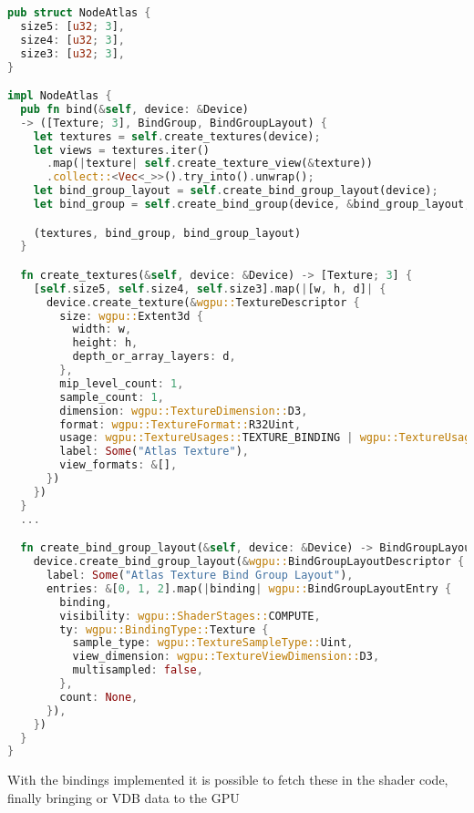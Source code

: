 \begin{enumerate}
\begin{lstlisting}[language=rust, captionpos=b, caption={
    \texttt{NodeAtlas} definition: The three fields in are the sizes of each atlas.
    The \texttt{create\_textures} creates 3 textures, sets the correct dimensions and sets value type to \texttt{R32Uint} represent a 4 byte single channel which can be used depending on what the value represents.
    The \texttt{create\_bind\_group\_layout} preparse the binding for compute shaders, setting the sample type to \texttt{Uint} to give eas of acess to the atlases; data.
},label={atlas2idx}]
pub struct NodeAtlas {
  size5: [u32; 3],
  size4: [u32; 3],
  size3: [u32; 3],
}

impl NodeAtlas {
  pub fn bind(&self, device: &Device)
  -> ([Texture; 3], BindGroup, BindGroupLayout) {
    let textures = self.create_textures(device);
    let views = textures.iter()
      .map(|texture| self.create_texture_view(&texture))
      .collect::<Vec<_>>().try_into().unwrap();
    let bind_group_layout = self.create_bind_group_layout(device);
    let bind_group = self.create_bind_group(device, &bind_group_layout, &views);

    (textures, bind_group, bind_group_layout)
  }

  fn create_textures(&self, device: &Device) -> [Texture; 3] {
    [self.size5, self.size4, self.size3].map(|[w, h, d]| {
      device.create_texture(&wgpu::TextureDescriptor {
        size: wgpu::Extent3d {
          width: w,
          height: h,
          depth_or_array_layers: d,
        },
        mip_level_count: 1,
        sample_count: 1,
        dimension: wgpu::TextureDimension::D3,
        format: wgpu::TextureFormat::R32Uint,
        usage: wgpu::TextureUsages::TEXTURE_BINDING | wgpu::TextureUsages::COPY_DST,
        label: Some("Atlas Texture"),
        view_formats: &[],
      })
    })
  }
  ...

  fn create_bind_group_layout(&self, device: &Device) -> BindGroupLayout {
    device.create_bind_group_layout(&wgpu::BindGroupLayoutDescriptor {
      label: Some("Atlas Texture Bind Group Layout"),
      entries: &[0, 1, 2].map(|binding| wgpu::BindGroupLayoutEntry {
        binding,
        visibility: wgpu::ShaderStages::COMPUTE,
        ty: wgpu::BindingType::Texture {
          sample_type: wgpu::TextureSampleType::Uint,
          view_dimension: wgpu::TextureViewDimension::D3,
          multisampled: false,
        },
        count: None,
      }),
    })
  }
}
\end{lstlisting}
        With the bindings implemented it is possible to fetch these in the shader code, finally bringing or VDB data to the GPU


\end{enumerate}
